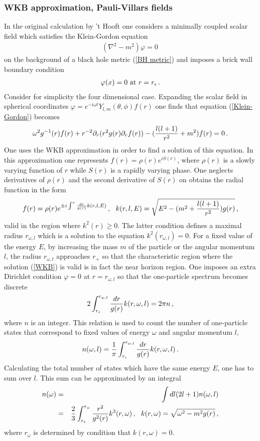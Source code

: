 \documentclass[12pt]{article}
\def\be{\begin{eqnarray}}
\def\ee{\end{eqnarray}}
\def\lb{\label}
\def\o{\over}
\begin{document}
\subsubsection{ WKB approximation, Pauli-Villars fields}
In the original  calculation by 't Hooft  one considers a minimally coupled scalar field which satisfies the Klein-Gordon equation
\be
(\nabla^2-m^2)\varphi=0\, 
\lb{Klein-Gordon}
\ee
on the background of a black hole metric (\ref{BH metric}) and imposes a brick wall  boundary condition 
\be
\varphi(x)=0\ {\rm at} \ r=r_\epsilon\, .
\lb{BW condition}
\ee
Consider for simplicity the four dimensional case. 
Expanding the scalar field in spherical coordinates $\varphi=e^{-i\omega t}Y_{l,m}(\theta,\phi) f(r)$ one finds that equation (\ref{Klein-Gordon}) becomes
\be
\omega^2 g^{-1}(r)f(r)+r^{-2}\partial_r(r^2g(r)\partial_rf(r))-({l(l+1)\o r^2}+m^2)f(r)=0\, .
\lb{field equation}
\ee
One uses the WKB approximation in order to find a solution of this equation. In this approximation one represents $f(r)=\rho(r)e^{iS(r)}$, where
$\rho(r)$ is a slowly varying function of $r$ while $S(r)$ is a rapidly varying phase. One neglects derivatives of $\rho(r)$ and the second derivative
of $S(r)$ on obtains the radial function in the form
\be
f(r)=\rho(r)e^{\pm i\int^r{dr\o g(r)}k(r,l,E)}\, , \ \ k(r,l,E)=\sqrt{E^2-(m^2+{l(l+1)\o r^2})g(r)}\, ,
\lb{WKB}\ee
valid in the region where $k^2(r)\geq  0$. The latter condition defines a maximal radius $r_{\omega,l}$ which is a solution to the equation $k^2(r_{\omega,l})=0$. For a fixed value of the energy  $E$, 
by increasing the mass $m$ of the particle or the angular momentum $l$, the radius $r_{\omega,l}$ approaches $r_+$ so that the characteristic region where the solution (\ref{WKB}) is valid 
is in fact the near horizon region. One imposes an extra Dirichlet condition $\varphi=0$ at $r=r_{\omega,l}$ so that the one-particle spectrum becomes discrete
\be
2\int_{r_\epsilon}^{r_{\omega,l}}{dr\o g(r)}k(r,\omega,l)=2\pi n\, ,
\lb{quantization condition}
\ee
where $n$ is an integer. This relation is used to count the number of one-particle states that correspond to fixed values of energy $\omega$ and angular momentum $l$,
\be
n(\omega,l)={1\o \pi}\int_{r_\epsilon}^{r_{\omega,l}}{dr\o g(r)}k(r,\omega,l)\, .
\lb{number of states}
\ee
Calculating the total number of  states which have the same energy $E$, one has to sum over $l$. This sum can be approximated by an integral
\be
n(\omega)&=&\int dl(2l+1)n(\omega,l)\nonumber\\&=&{2\o 3}\int_{r_\epsilon}^{r_\omega} {r^2\o g^2(r)}k^3(r,\omega)\, , \ \ k(r,\omega)=\sqrt{\omega^2-m^2g(r)}\, ,
\lb{modes}
\ee
where $r_\omega$ is determined by condition that $k(r,\omega)=0$. 
\end{document}
